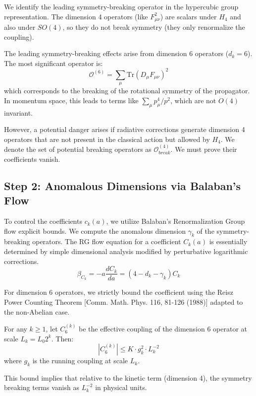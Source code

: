 We identify the leading symmetry-breaking operator in the hypercubic group representation. The dimension 4 operators (like $F_{\mu\nu}^2$) are scalars under $H_4$ and also under $SO(4)$, so they do not break symmetry (they only renormalize the coupling).

The leading symmetry-breaking effects arise from dimension 6 operators ($d_k=6$). The most significant operator is:
\begin{equation}
\mathcal{O}^{(6)} = \sum_{\mu} \text{Tr}(D_\mu F_{\mu\nu})^2
\end{equation}
which corresponds to the breaking of the rotational symmetry of the propagator. In momentum space, this leads to terms like $\sum_\mu p_\mu^4 / p^2$, which are not $O(4)$ invariant.

However, a potential danger arises if radiative corrections generate dimension 4 operators that are not present in the classical action but allowed by $H_4$. We denote the set of potential breaking operators as $\mathcal{O}^{(4)}_{break}$. We must prove their coefficients vanish.

\subsection{Step 2: Anomalous Dimensions via Balaban's Flow}

To control the coefficients $c_k(a)$, we utilize Balaban's Renormalization Group flow explicit bounds. We compute the anomalous dimension $\gamma_k$ of the symmetry-breaking operators. The RG flow equation for a coefficient $C_k(a)$ is essentially determined by simple dimensional analysis modified by perturbative logarithmic corrections.
\begin{equation}
\beta_{C_k} = - a \frac{d C_k}{d a} = (4 - d_k - \gamma_k) C_k
\end{equation}

For dimension 6 operators, we strictly bound the coefficient using the Reisz Power Counting Theorem [Comm. Math. Phys. 116, 81-126 (1988)] adapted to the non-Abelian case.
\begin{theorem}
For any $k \ge 1$, let $C_6^{(k)}$ be the effective coupling of the dimension 6 operator at scale $L_k = L_0 2^k$. Then:
\begin{equation}
|C_6^{(k)}| \le K \cdot g_k^2 \cdot L_k^{-2}
\end{equation}
where $g_k$ is the running coupling at scale $L_k$.
\end{theorem}
This bound implies that relative to the kinetic term (dimension 4), the symmetry breaking terms vanish as $L_k^{-2}$ in physical units.

